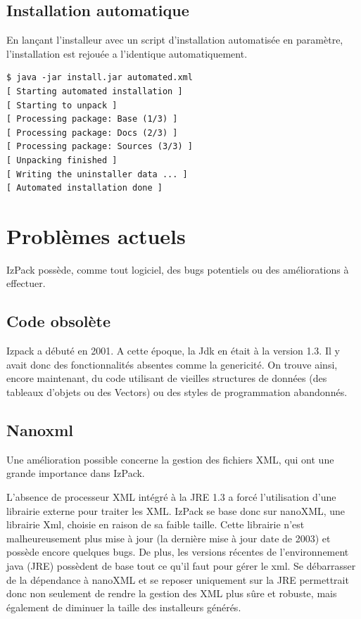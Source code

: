 \subsection{Installation automatique}
En lançant l'installeur avec un script d'installation automatisée en paramètre, l'installation est rejouée a l'identique automatiquement.
\begin{verbatim}
$ java -jar install.jar automated.xml
[ Starting automated installation ]
[ Starting to unpack ]
[ Processing package: Base (1/3) ]
[ Processing package: Docs (2/3) ]
[ Processing package: Sources (3/3) ]
[ Unpacking finished ]
[ Writing the uninstaller data ... ]
[ Automated installation done ]
\end{verbatim}


\section{Problèmes actuels}
IzPack possède, comme tout logiciel, des bugs potentiels ou des améliorations à effectuer.
\subsection{Code obsolète}
Izpack a débuté en 2001. A cette époque, la Jdk en était à la version 1.3. Il y avait donc des fonctionnalités absentes comme la genericité. On trouve ainsi, encore maintenant, du code utilisant de vieilles structures de données (des tableaux d'objets ou des Vectors) ou des styles de programmation abandonnés.
\subsection{Nanoxml}
Une amélioration possible concerne la gestion des fichiers XML, qui ont une grande importance dans IzPack.

L'absence de processeur XML intégré à la JRE 1.3 a forcé l'utilisation d'une librairie externe pour traiter les XML. IzPack se base donc sur nanoXML, une librairie Xml, choisie en raison de sa faible taille.
Cette librairie n'est malheureusement plus mise à jour (la dernière mise à jour date de 2003) et possède encore quelques bugs.
De plus, les versions récentes de l'environnement java (JRE) possèdent de base tout ce qu'il faut pour gérer le xml.
Se débarrasser de la dépendance à nanoXML et se reposer uniquement sur la JRE permettrait donc non seulement de rendre la gestion des XML plus sûre et robuste, mais également de diminuer la taille des installeurs générés.
